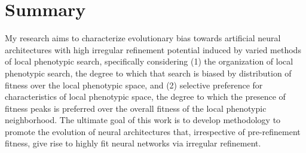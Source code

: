 \section{Summary}

My research aims to characterize evolutionary bias towards artificial neural architectures with high irregular refinement potential induced by varied methods of local phenotypic search, specifically considering (1) the organization of local phenotypic search, the degree to which that search is biased by distribution of fitness over the local phenotypic space, and (2) selective preference for characteristics of local phenotypic space, the degree to which the presence of fitness peaks is preferred over the overall fitness of the local phenotypic neighborhood. The ultimate goal of this work is to develop methodology to promote the evolution of neural architectures that, irrespective of pre-refinement fitness, give rise to highly fit neural networks via irregular refinement.
